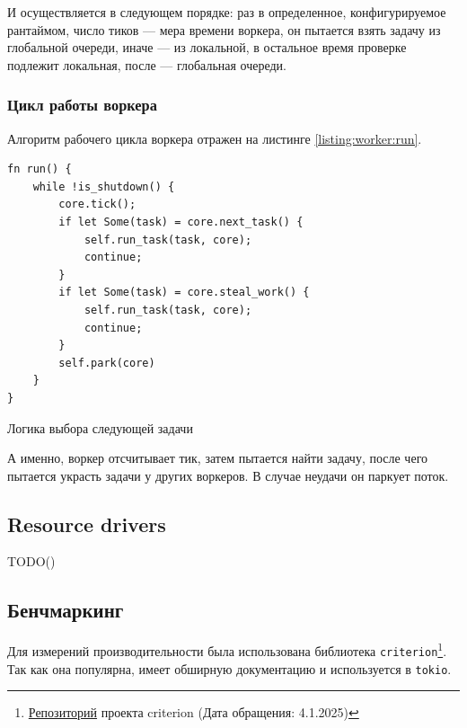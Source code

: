 И осуществляется в следующем порядке: раз в определенное, конфигурируемое рантаймом, число тиков --- мера времени воркера, он пытается взять задачу из глобальной очереди, иначе --- из локальной, в остальное время проверке подлежит локальная, после --- глобальная очереди.

\subsubsection{Цикл работы воркера}

Алгоритм рабочего цикла воркера отражен на листинге \ref{listing:worker:run}.

\begin{listing}[H]
    \begin{verbatim}
fn run() {
    while !is_shutdown() {
        core.tick();
        if let Some(task) = core.next_task() {
            self.run_task(task, core);
            continue;
        }
        if let Some(task) = core.steal_work() {
            self.run_task(task, core);
            continue;
        }
        self.park(core)
    }
}
    \end{verbatim}

    \caption{Логика выбора следующей задачи}
    \label{listing:worker:run}
\end{listing}

А именно, воркер отсчитывает тик, затем пытается найти задачу, после чего пытается украсть задачи у других воркеров. В случае неудачи он паркует поток.

\subsection{Resource drivers}

TODO()

\subsection{Бенчмаркинг}

Для измерений производительности была использована библиотека \verb|criterion|\footnote{\href{https://github.com/bheisler/criterion.rs}{Репозиторий} проекта criterion (Дата обращения: 4.1.2025)}. Так как она популярна, имеет обширную документацию и используется в \verb|tokio|.
